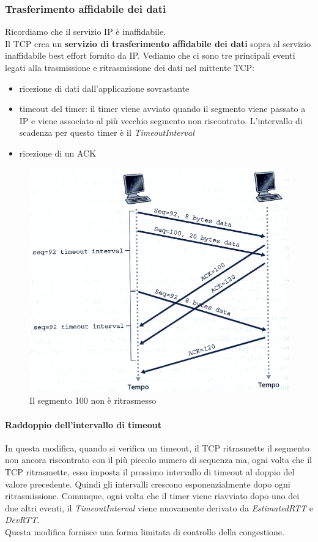 \documentclass[11pt,a4paper]{article}
\begin{document}
\subsubsection{Trasferimento affidabile dei dati}
Ricordiamo che il servizio IP è inaffidabile.\\
Il TCP crea un \textbf{servizio di trasferimento affidabile dei dati} sopra al servizio inaffidabile best effort fornito da IP. Vediamo che ci sono tre principali eventi legati alla trasmissione e ritrasmissione dei dati nel mittente TCP:
\begin{itemize}
	\item ricezione di dati dall'applicazione sovrastante
	\item timeout del timer: il timer viene avviato quando il segmento viene passato a IP e viene associato al più vecchio segmento non riscontrato. L'intervallo di scadenza per questo timer è il \emph{TimeoutInterval}
	\item ricezione di un ACK
\end{itemize}
\begin{figure}
	\includegraphics[scale=0.6]{img/033.png}
	\caption{Il segmento 100 non è ritrasmesso}
\end{figure}
\paragraph{Raddoppio dell'intervallo di timeout}
In questa modifica, quando si verifica un timeout, il TCP ritrasmette il segmento non ancora riscontrato con il più piccolo numero di sequenza ma, ogni volta che il TCP ritrasmette, esso imposta il prossimo intervallo di timeout al doppio del valore precedente. Quindi gli intervalli crescono esponenzialmente dopo ogni ritrasmissione. Comunque, ogni volta che il timer viene riavviato dopo uno dei due altri eventi, il \emph{TimeoutInterval} viene nuovamente derivato da \emph{EstimatedRTT} e \emph{DevRTT}. \\
Questa modifica fornisce una forma limitata di controllo della congestione.
\end{document}
